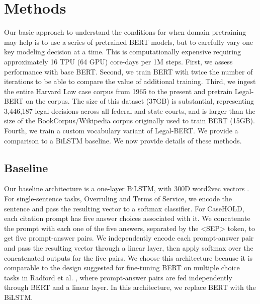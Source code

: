 \documentclass[sigconf]{acmart}
\begin{document}
\section{Methods}
\label{sec:methods}

Our basic approach to understand the conditions for when domain pretraining may help is to use a series of pretrained BERT models, but to carefully vary one key modeling decision at a time. This is computationally expensive requiring approximately 16 TPU (64 GPU) core-days per 1M steps. First, we assess performance with base BERT. Second, we train BERT with twice the number of iterations to be able to compare the value of additional training. Third, we ingest the entire Harvard Law case corpus from 1965 to the present and pretrain Legal-BERT on the corpus. The size of this dataset (37GB) is substantial, representing 3,446,187 legal decisions across all federal and state courts, and is larger than the size of the BookCorpus/Wikipedia corpus originally used to train BERT (15GB). Fourth, we train a custom vocabulary variant of Legal-BERT. We provide a comparison to a BiLSTM baseline. We now provide details of these methods.

\subsection{Baseline}
Our baseline architecture is a one-layer BiLSTM, with 300D word2vec vectors \cite{DBLP:journals/corr/abs-1301-3781}. For single-sentence tasks, Overruling and Terms of Service, we encode the sentence and pass the resulting vector to a softmax classifier. For CaseHOLD, each citation prompt has five answer choices associated with it. We concatenate the prompt with each one of the five answers, separated by the <SEP> token, to get five prompt-answer pairs. We independently encode each prompt-answer pair and pass the resulting vector through a linear layer, then apply softmax over the concatenated outputs for the five pairs. We choose this architecture because it is comparable to the design suggested for fine-tuning BERT on multiple choice tasks in Radford et al. \cite{radford2018improving}, where prompt-answer pairs are fed independently through BERT and a linear layer. In this architecture, we replace BERT with the BiLSTM.
\end{document}

